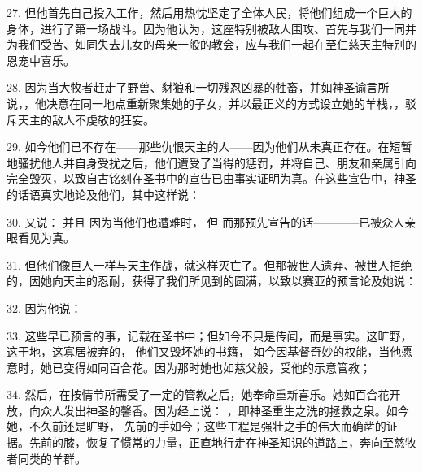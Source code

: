 27. 但他首先自己投入工作，然后用热忱坚定了全体人民，将他们组成一个巨大的身体，进行了第一场战斗。因为他认为，这座特别被敌人围攻、首先与我们一同并为我们受苦、如同失去儿女的母亲一般的教会，应与我们一起在至仁慈天主特别的恩宠中喜乐。\par

28. 因为当大牧者赶走了野兽、豺狼和一切残忍凶暴的牲畜，并如神圣谕言所说，，他决意在同一地点重新聚集她的子女，并以最正义的方式设立她的羊栈，，驳斥天主的敌人不虔敬的狂妄。\par

29. 如今他们已不存在——那些仇恨天主的人——因为他们从未真正存在。在短暂地骚扰他人并自身受扰之后，他们遭受了当得的惩罚，并将自己、朋友和亲属引向完全毁灭，以致自古铭刻在圣书中的宣告已由事实证明为真。在这些宣告中，神圣的话语真实地论及他们，其中这样说：\par

30.  又说： 并且  因为当他们也遭难时， 但  而那预先宣告的话————已被众人亲眼看见为真。\par

31. 但他们像巨人一样与天主作战，就这样灭亡了。但那被世人遗弃、被世人拒绝的，因她向天主的忍耐，获得了我们所见到的圆满，以致以赛亚的预言论及她说：\par

32.    因为他说：\par

33. 这些早已预言的事，记载在圣书中；但如今不只是传闻，而是事实。这旷野，这干地，这寡居被弃的， 他们又毁坏她的书籍，  如今因基督奇妙的权能，当他愿意时，她已变得如同百合花。因为那时她也如慈父般，受他的示意管教；\par

34. 然后，在按情节所需受了一定的管教之后，她奉命重新喜乐。她如百合花开放，向众人发出神圣的馨香。因为经上说： ，即神圣重生之洗的拯救之泉。如今她，不久前还是旷野，  先前的手如今；这些工程是强壮之手的伟大而确凿的证据。先前的膝，恢复了惯常的力量，正直地行走在神圣知识的道路上，奔向至慈牧者同类的羊群。\par

